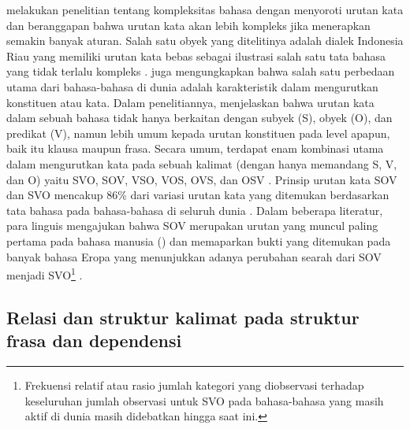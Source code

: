 \cite{gil2001creoles} melakukan penelitian tentang kompleksitas bahasa dengan menyoroti urutan kata dan beranggapan bahwa urutan kata akan lebih kompleks jika menerapkan semakin banyak aturan. Salah satu obyek yang ditelitinya adalah dialek Indonesia Riau yang memiliki urutan kata bebas sebagai ilustrasi salah satu tata bahasa yang tidak terlalu kompleks \citep{gil2001creoles}. \cite{dryer2007word} juga mengungkapkan bahwa salah satu perbedaan utama dari bahasa-bahasa di dunia adalah karakteristik dalam mengurutkan konstituen atau kata. Dalam penelitiannya, \cite{dryer2007word} menjelaskan bahwa urutan kata dalam sebuah bahasa tidak hanya berkaitan dengan subyek (S), obyek (O), dan predikat (V), namun lebih umum kepada urutan konstituen pada level apapun, baik itu klausa maupun frasa. Secara umum, terdapat enam kombinasi utama dalam mengurutkan kata pada sebuah kalimat (dengan hanya memandang S, V, dan O) yaitu SVO, SOV, VSO, VOS, OVS, dan OSV \citep{dryer2007word}. Prinsip urutan kata SOV dan SVO mencakup 86\% dari variasi urutan kata yang ditemukan berdasarkan tata bahasa pada bahasa-bahasa di seluruh dunia \citep{dryer2005world}. Dalam beberapa literatur, para linguis mengajukan bahwa SOV merupakan urutan yang muncul paling pertama pada bahasa manusia (\citealp{givon1979syntax, gell2011origin, newmeyer2000language}) dan memaparkan bukti yang ditemukan pada banyak bahasa Eropa yang menunjukkan adanya perubahan searah dari SOV menjadi SVO\footnote{Frekuensi relatif atau rasio jumlah kategori yang diobservasi terhadap keseluruhan jumlah observasi untuk SVO pada bahasa-bahasa yang masih aktif di dunia masih didebatkan hingga saat ini.} \citep{newmeyer2000language}. 
 
\subsection{Relasi dan struktur kalimat pada struktur frasa dan dependensi}

